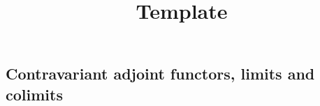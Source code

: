 \documentclass[../../solutions]{subfiles}
\title{Template}
\author{}
\begin{document}
\maketitle

\subsection{Contravariant adjoint functors, limits and colimits}
\label{ssec:contravariant-adjoints-limits}
\end{document}
